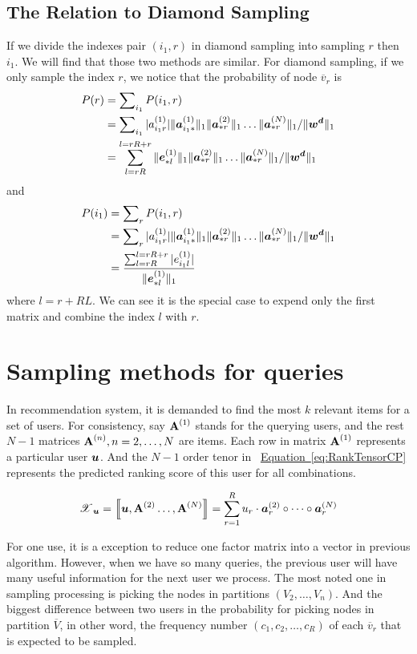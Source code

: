 \documentclass[letterpaper]{article}
\newcommand{\Sca}[3]{{#1}^{(#2)}_{i_#2#3}}%
\newcommand{\T}[1]{\boldsymbol{\mathscr{\MakeUppercase{#1}}}}
\newcommand{\KT}[1]{\left\llbracket #1 \right\rrbracket}
\newcommand{\V}[1]{{\bm{{\MakeLowercase{#1}}}}}
\newcommand{\VnC}[3]{\V{#1}^{(#2)}_{#3}}
\newcommand{\Varow}[1]{\V{a}^{(#1)}_{i_#1*}}
\newcommand{\Vacol}[1]{\V{a}^{(#1)}_{*r}}
\newcommand{\M}[1]{{\bm{\mathbf{\MakeUppercase{#1}}}}}
\newcommand{\Mn}[2]{\M{#1}^{(#2)}}
\newcommand{\norm}[2]{\|#1\|_{#2}}
\newcommand{\Eqn}[1] {\hyperref[eq:#1]  {Equation~\ref*{eq:#1}}}
\begin{document}
\subsection{The Relation to Diamond Sampling}
If we divide the indexes pair $(i_1,r)$ in diamond sampling into sampling $r$ then $i_1$. We will find that those two methods are similar. For diamond sampling, if we only sample the index $r$, we notice that the probability of node $\overline{v}_r$ is
\begin{align*}
P(r) &= \sum\nolimits_{i_1}P(i_1,r)\\
&= \sum\nolimits_{i_1}
|\Sca{a}{1}{r}|\norm{\Varow{1}}{1} \norm{\Vacol{2}}{1} \ldots \norm{\Vacol{N}}{1}
/ \norm{\V{W^d}}{1}\\
& = \sum_{l=rR}^{l=rR+r}\norm{\VnC{e}{1}{*l}}{1}\norm{\Vacol{2}}{1} \ldots \norm{\Vacol{N}}{1}
/ \norm{\V{W^d}}{1}
\end{align*}
and
\begin{align*}
P(i_1) &= \sum\nolimits_{r}P(i_1,r)\\
&= \sum\nolimits_{r}
|\Sca{a}{1}{r}|\norm{\Varow{1}}{1} \norm{\Vacol{2}}{1} \ldots \norm{\Vacol{N}}{1}
/ \norm{\V{W^d}}{1}\\
& = \frac{\sum_{l=rR}^{l=rR+r}|e^{(1)}_{i_1l}|}{\norm{\VnC{e}{1}{*l}}{1}}
\end{align*}
where $l=r+RL$. We can see it is the special case to expend only the first matrix and combine the index $l$ with $r$.
\section{Sampling methods for queries}

In recommendation system, it is demanded to find the most $k$ relevant items for a set of users. For consistency, say $\M{A}^{(1)}$ stands for the querying users, and the rest $N-1$ matrices $\M{A}^{(n)},n=2,\ldots,N$ are items. Each row in matrix $\M{A}^{(1)}$ represents a particular user $\V{u}$. And the $N-1$ order tenor in ~\Eqn{RankTensorCP} represents the predicted ranking score of this user for all combinations.

\begin{equation}\label{eq:RankTensorCP}
\T{X}_{\V{u}}= \KT{ \V{u},\Mn{A}{2}\dots,\Mn{A}{N}} =
\sum_{r=1}^{R} u_r \cdot \VnC{A}{2}{r}\circ \cdots \circ \VnC{A}{N}{r}
\end{equation}

For one use, it is a exception to reduce one factor matrix into a vector in previous algorithm. However, when we have so many queries, the previous user will have many useful information for the next user we process. The most noted one in sampling processing is picking the nodes in partitions $(V_2,\ldots,V_n)$. And the biggest difference between two users in the probability for picking nodes in partition $\overline{V}$, in other word, the frequency number $(c_1,c_2,\ldots,c_R)$ of each $\overline{v}_r$ that is expected to be sampled.
\end{document}
